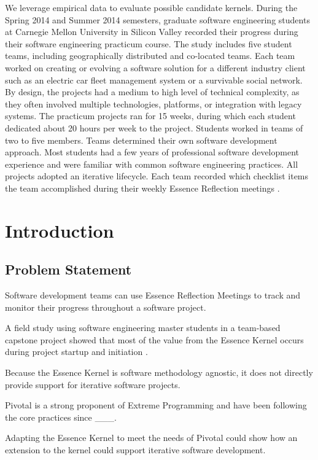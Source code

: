 \documentclass[preprint,12pt,3p]{elsarticle}
\begin{document}
We leverage empirical data to evaluate possible candidate kernels. During the Spring 2014 and Summer 2014 semesters, graduate software engineering students at Carnegie Mellon University in Silicon Valley recorded their progress during their software engineering practicum course. The study includes five student teams, including geographically distributed and co-located
teams. Each team worked on creating or evolving a software solution for a different industry client such as an electric car fleet management system or a survivable social network. By design, the projects had a medium to high level of technical complexity, as they often involved multiple technologies, platforms, or integration with legacy systems. The practicum
projects ran for 15 weeks, during which each student dedicated about 20 hours per week to the project. Students worked in teams of two to five members. Teams determined their own software development approach. Most students had a few years of professional software development experience and were familiar with common software engineering practices. All projects adopted an iterative lifecycle. Each team recorded which checklist items the team accomplished during their weekly Essence Reflection meetings \cite{EASE2014}.

\section{Introduction}

\subsection{Problem Statement}
Software development teams can use Essence Reflection Meetings \cite{EASE2014} to track and monitor their progress throughout a software project. 

A field study using software engineering master students in a team-based capstone project showed that most of the value from the Essence Kernel occurs during project startup and initiation \cite{ICSE2014}.

Because the Essence Kernel is software methodology agnostic, it does not directly provide support for iterative software projects. \cite{ICSE2014}

Pivotal is a strong proponent of Extreme Programming and have been following the core practices since ___.

Adapting the Essence Kernel to meet the needs of Pivotal could show how an extension to the kernel could support iterative software development.
\end{document}
